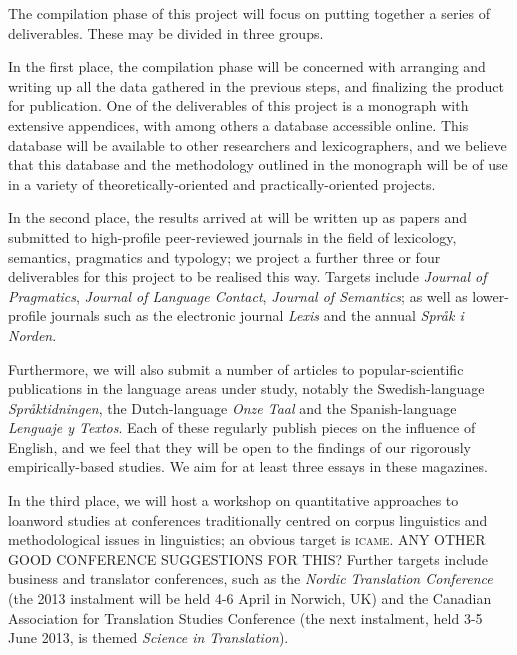 \documentclass[a4paper]{article}
\begin{document}
The compilation phase of this project will focus on putting together a series of deliverables. These may be divided in three groups.

In the first place, the compilation phase will be concerned with arranging and writing up all the data gathered in the previous steps, and finalizing the product for publication. One of the deliverables of this project is a monograph with extensive appendices, with among others a database accessible online. This database will be available to other researchers and lexicographers, and we believe that this database and the methodology outlined in the monograph will be of use in a variety of theoretically-oriented and practically-oriented projects.

In the second place, the results arrived at will be written up as papers and submitted to high-profile peer-reviewed journals in the field of lexicology, semantics, pragmatics and typology; we project a further three or four deliverables for this project to be realised this way. Targets include \emph{Journal of Pragmatics}, \emph{Journal of Language Contact}, \emph{Journal of Semantics}; as well as lower-profile journals such as the electronic journal \emph{Lexis} and the annual \emph{Spr\aa k i Norden}.

Furthermore, we will also submit a number of articles to popular-scientific publications in the language areas under study, notably the Swedish-language \emph{Spr\aa ktidningen}, the Dutch-language \emph{Onze Taal} and the Spanish-language \\ \emph{Lenguaje y Textos}. Each of these regularly publish pieces on the influence of English, and we feel that they will be open to the findings of our rigorously empirically-based studies. We aim for at least three essays in these magazines.

In the third place, we will host a workshop on quantitative approaches to loanword studies at conferences traditionally centred on corpus linguistics and methodological issues in linguistics; an obvious target is \textsc{icame}. ANY OTHER GOOD CONFERENCE SUGGESTIONS FOR THIS? Further targets include business and translator conferences, such as the \emph{Nordic Translation Conference} (the 2013 instalment will be held 4-6 April in Norwich, UK) and the Canadian Association for Translation Studies Conference (the next instalment, held 3-5 June 2013, is themed \emph{Science in Translation}). 
\end{document}

